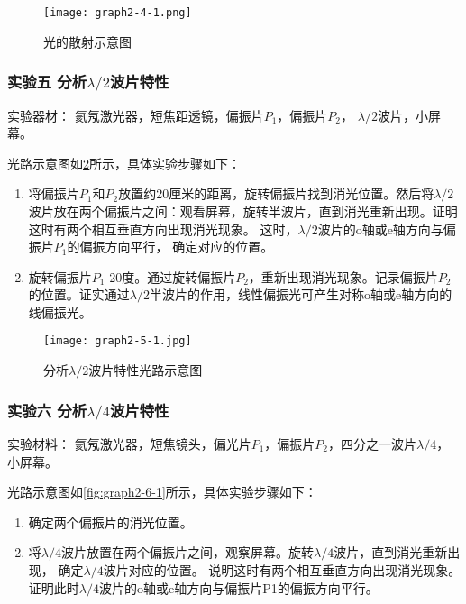 \documentclass[dvipsnames, svgnames,a4paper,11pt]{article}
\begin{document}
	\begin{figure}[htbp]
		\centering
		\texttt{[image: graph2-4-1.png]}
		\caption{光的散射示意图}
		\label{fig:graph2-4-1}
	\end{figure}



	\subsubsection{实验五 \quad 分析$\lambda/2$波片特性}

	实验器材： 氦氖激光器，短焦距透镜，偏振片$P_1$，偏振片$P_2$， $\lambda/2$波片，小屏幕。

	光路示意图如\cref{fig:graph2-5-1}所示，具体实验步骤如下：
	\begin{enumerate}
		\item 将偏振片$P_1$和$P_2$放置约20厘米的距离，旋转偏振片找到消光位置。然后将$\lambda/2$波片放在两个偏振片之间：观看屏幕，旋转半波片，直到消光重新出现。证明这时有两个相互垂直方向出现消光现象。 这时，$\lambda/2$波片的o轴或e轴方向与偏振片$P_1$的偏振方向平行， 确定对应的位置。
		\item 旋转偏振片$P_1$ 20度。通过旋转偏振片$P_2$，重新出现消光现象。记录偏振片$P_2$的位置。证实通过$\lambda/2$半波片的作用，线性偏振光可产生对称o轴或e轴方向的线偏振光。
	\end{enumerate}


	\begin{figure}[htbp]
		\centering
		\texttt{[image: graph2-5-1.jpg]}
		\caption{分析$\lambda/2$波片特性光路示意图}
		\label{fig:graph2-5-1}
	\end{figure}


	\subsubsection{实验六 \quad 分析$\lambda/4$波片特性}

	实验材料： 氦氖激光器，短焦镜头，偏光片$P_1$，偏振片$P_2$，四分之一波片$\lambda/4$，小屏幕。

	光路示意图如\cref{fig:graph2-6-1}所示，具体实验步骤如下：
	\begin{enumerate}
		\item 确定两个偏振片的消光位置。
		\item 将$\lambda/4$波片放置在两个偏振片之间，观察屏幕。旋转$\lambda/4$波片，直到消光重新出现， 确定$\lambda/4$波片对应的位置。 说明这时有两个相互垂直方向出现消光现象。 证明此时$\lambda/4$波片的o轴或e轴方向与偏振片P1的偏振方向平行。
	\end{enumerate}
\end{document}
